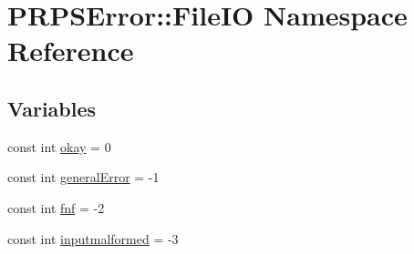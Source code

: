 \hypertarget{namespace_p_r_p_s_error_1_1_file_i_o}{\section{\-P\-R\-P\-S\-Error\-:\-:\-File\-I\-O \-Namespace \-Reference}
\label{namespace_p_r_p_s_error_1_1_file_i_o}
}
\subsection*{\-Variables}
\begin{DoxyCompactItemize}
\item 
const int \hyperlink{namespace_p_r_p_s_error_1_1_file_i_o_a830919fa2b755d9e856ed4e1c514bf8e}{okay} = 0
\item 
const int \hyperlink{namespace_p_r_p_s_error_1_1_file_i_o_a658d8bf148faadc2f0fcc679b7a601ed}{general\-Error} = -\/1
\item 
const int \hyperlink{namespace_p_r_p_s_error_1_1_file_i_o_a0fa189c7ae0fb399e588ab8540d0d36c}{fnf} = -\/2
\item 
const int \hyperlink{namespace_p_r_p_s_error_1_1_file_i_o_a6aef97ba368bc86d96cb6be41d0766e2}{inputmalformed} = -\/3
\end{DoxyCompactItemize}


